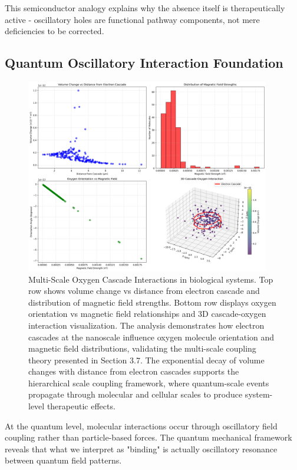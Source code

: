 \documentclass[12pt,a4paper]{article}
\begin{document}
This semiconductor analogy explains why the absence itself is therapeutically active - oscillatory holes are functional pathway components, not mere deficiencies to be corrected.

\subsection{Quantum Oscillatory Interaction Foundation}

\begin{figure}[htbp]
    \centering
    \includegraphics[width=0.95\textwidth]{images/oxygen_cascade.png}
    \caption{Multi-Scale Oxygen Cascade Interactions in biological systems. Top row shows volume change vs distance from electron cascade and distribution of magnetic field strengths. Bottom row displays oxygen orientation vs magnetic field relationships and 3D cascade-oxygen interaction visualization. The analysis demonstrates how electron cascades at the nanoscale influence oxygen molecule orientation and magnetic field distributions, validating the multi-scale coupling theory presented in Section 3.7. The exponential decay of volume changes with distance from electron cascades supports the hierarchical scale coupling framework, where quantum-scale events propagate through molecular and cellular scales to produce system-level therapeutic effects.}
    \label{fig:oxygen_cascade}
    \end{figure}

At the quantum level, molecular interactions occur through oscillatory field coupling rather than particle-based forces. The quantum mechanical framework reveals that what we interpret as "binding" is actually oscillatory resonance between quantum field patterns.
\end{document}

